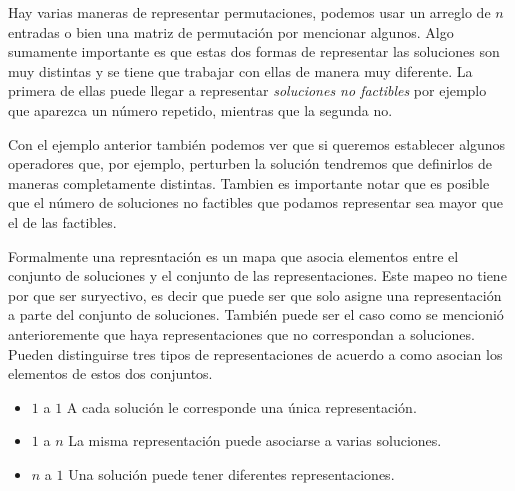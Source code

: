 Hay varias maneras de representar permutaciones, podemos usar un arreglo de $n$ entradas o bien una matriz de permutación por mencionar algunos. Algo sumamente importante es que estas dos formas de representar las soluciones son muy distintas y se tiene que trabajar con ellas de manera muy diferente. La primera de ellas puede llegar a representar \textit{soluciones no factibles} por ejemplo que aparezca un número repetido, mientras que la segunda no.

Con el ejemplo anterior también podemos ver que si queremos establecer algunos operadores que, por ejemplo, perturben la solución tendremos que definirlos de maneras completamente distintas. Tambien es importante notar que es posible que el número de soluciones no factibles que podamos representar sea mayor que el de las factibles.

Formalmente una represntación es un mapa que asocia elementos entre el conjunto de soluciones y el conjunto de las representaciones. Este mapeo no tiene por que ser suryectivo, es decir que puede ser que solo asigne una representación a parte del conjunto de soluciones. También puede ser el caso como se mencionió anterioremente que haya representaciones que no correspondan a soluciones. Pueden distinguirse tres tipos de representaciones\cite{Cheng1996} de acuerdo a como asocian los elementos de estos dos conjuntos.
\begin{itemize}
    \item $1$ a $1$ A cada solución le corresponde una única representación.
    \item $1$ a $n$ La misma representación puede asociarse a varias soluciones.
    \item $n$ a $1$ Una solución puede tener diferentes representaciones.
\end{itemize}

